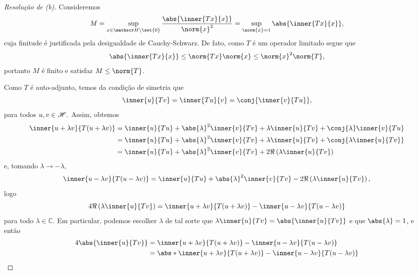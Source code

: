 \begin{proof}[Resolução de (b)]
  Consideremos
  \begin{equation*}
    M = \sup_{x \in \hilbert\setminus\set{0}}{\frac{\abs{\inner{Tx}{x}}}{\norm{x}^2}} = \sup_{\norm{x} = 1}{\abs{\inner{Tx}{x}}},
  \end{equation*}
  cuja finitude é justificada pela desigualdade de Cauchy-Schwarz. De fato, como \(T\) é um operador limitado segue que
  \begin{equation*}
    \abs{\inner{Tx}{x}} \leq \norm{Tx} \norm{x} \leq \norm{x}^2\norm{T},
  \end{equation*}
  portanto \(M\) é finito e satisfaz \(M \leq \norm{T}\).

  Como \(T\) é auto-adjunto, temos da condição de simetria que
  \begin{equation*}
    \inner{u}{Tv} = \inner{Tu}{v} = \conj{\inner{v}{Tu}},
  \end{equation*}
  para todos \(u, v\in\mathscr{H}.\) Assim, obtemos
  \begin{align*}
    \inner{u + \lambda v}{T(u + \lambda v)} &= \inner{u}{Tu} + \abs{\lambda}^2\inner{v}{Tv} + \lambda\inner{u}{Tv} + \conj{\lambda} \inner{v}{Tu}\\
                                            &= \inner{u}{Tu} + \abs{\lambda}^2\inner{v}{Tv} + \lambda\inner{u}{Tv} + \conj{\lambda \inner{u}{Tv}}\\
                                            &= \inner{u}{Tu} + \abs{\lambda}^2 \inner{v}{Tv} + 2 \Re\left(\lambda \inner{u}{Tv}\right)
  \end{align*}
  e, tomando \(\lambda \to -\lambda,\)
  \begin{equation*}
      \inner{u - \lambda v}{T(u - \lambda v)} = \inner{u}{Tu} + \abs{\lambda}^2 \inner{v}{Tv} - 2 \Re\left(\lambda \inner{u}{Tv}\right),
  \end{equation*}
  logo
  \begin{equation*}
    4 \Re\left(\lambda \inner{u}{Tv}\right) = \inner{u + \lambda v}{T(u + \lambda v)} - \inner{u - \lambda v}{T(u - \lambda v)}
  \end{equation*}
  para todo \(\lambda \in \mathbb{C}\). Em particular, podemos escolher \(\lambda\) de tal sorte que \(\lambda \inner{u}{Tv} = \abs{\inner{u}{Tv}}\) e que \(\abs{\lambda} = 1\), e então
  \begin{align*}
    4 \abs{\inner{u}{Tv}} &= \inner{u + \lambda v}{T(u + \lambda v)} - \inner{u - \lambda v}{T(u - \lambda v)}\\
                          &= \abs*{\inner{u + \lambda v}{T(u + \lambda v)} - \inner{u - \lambda v}{T(u - \lambda v)}}\\

\end{align*}
\end{proof}
